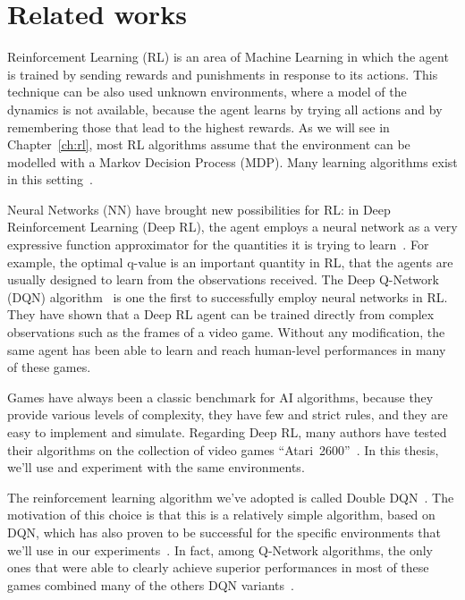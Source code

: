 \section{Related works}

\label{sec:intro-related}

Reinforcement Learning (RL) is an area of Machine Learning in which the agent
is trained by sending rewards and punishments in response to its actions.
This technique can be also used unknown environments, where a model of the
dynamics is not available, because the agent learns by trying all actions and
by remembering those that lead to the highest rewards. As we will see in
Chapter~\ref{ch:rl}, most RL algorithms assume that the environment can be
modelled with a Markov Decision Process (MDP). Many learning algorithms exist
in this setting~\cite{bib:rl-book}.

Neural Networks (NN) have brought new possibilities for RL: in Deep
Reinforcement Learning (Deep RL), the agent employs a neural network as a very
expressive function approximator for the quantities it is trying to
learn~\cite{bib:deep-rl}. For example, the optimal q-value is an important
quantity in RL, that the agents are usually designed to learn from the
observations received. The Deep Q-Network (DQN)
algorithm~\cite{bib:atari-deeprl} is one the first to successfully employ
neural networks in RL. They have shown that a Deep RL agent can be trained
directly from complex observations such as the frames of a video game. Without
any modification, the same agent has been able to learn and reach human-level
performances in many of these games.

Games have always been a classic benchmark for AI algorithms, because they
provide various levels of complexity, they have few and strict rules, and they
are easy to implement and simulate. Regarding Deep RL, many authors have
tested their algorithms on the collection of video games
``Atari~2600''~\cite{bib:atari-games}. In this thesis, we'll use and
experiment with the same environments.

The reinforcement learning algorithm we've adopted is called Double
DQN~\cite{bib:double-q}. The motivation of this choice is that this is a
relatively simple algorithm, based on DQN, which has also proven to be
successful for the specific environments that we'll use in our
experiments~\cite{bib:atari-deepq-nature}. In fact, among Q-Network
algorithms, the only ones that were able to clearly achieve superior
performances in most of these games combined many of the others DQN
variants~\cite{bib:rainbow}.

